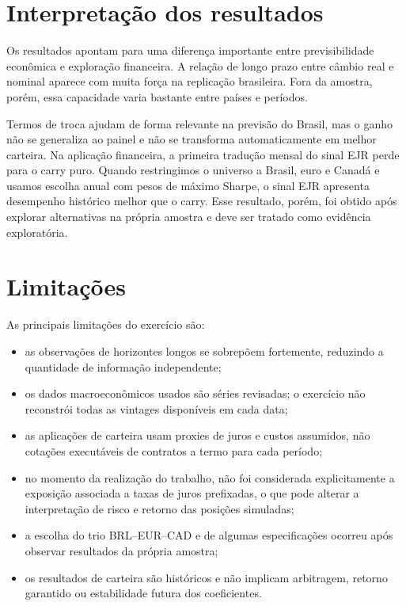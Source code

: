 \documentclass[11pt,a4paper]{article}
\begin{document}
\section{Interpretação dos resultados}

Os resultados apontam para uma diferença importante entre previsibilidade econômica e exploração financeira. A relação de longo prazo entre câmbio real e nominal aparece com muita força na replicação brasileira. Fora da amostra, porém, essa capacidade varia bastante entre países e períodos.

Termos de troca ajudam de forma relevante na previsão do Brasil, mas o ganho não se generaliza ao painel e não se transforma automaticamente em melhor carteira. Na aplicação financeira, a primeira tradução mensal do sinal EJR perde para o carry puro. Quando restringimos o universo a Brasil, euro e Canadá e usamos escolha anual com pesos de máximo Sharpe, o sinal EJR apresenta desempenho histórico melhor que o carry. Esse resultado, porém, foi obtido após explorar alternativas na própria amostra e deve ser tratado como evidência exploratória.

\section{Limitações}

As principais limitações do exercício são:

\begin{itemize}
    \item as observações de horizontes longos se sobrepõem fortemente, reduzindo a quantidade de informação independente;
    \item os dados macroeconômicos usados são séries revisadas; o exercício não reconstrói todas as vintages disponíveis em cada data;
    \item as aplicações de carteira usam proxies de juros e custos assumidos, não cotações executáveis de contratos a termo para cada período;
    \item no momento da realização do trabalho, não foi considerada explicitamente a exposição associada a taxas de juros prefixadas, o que pode alterar a interpretação de risco e retorno das posições simuladas;
    \item a escolha do trio BRL--EUR--CAD e de algumas especificações ocorreu após observar resultados da própria amostra;
    \item os resultados de carteira são históricos e não implicam arbitragem, retorno garantido ou estabilidade futura dos coeficientes.
\end{itemize}
\end{document}
